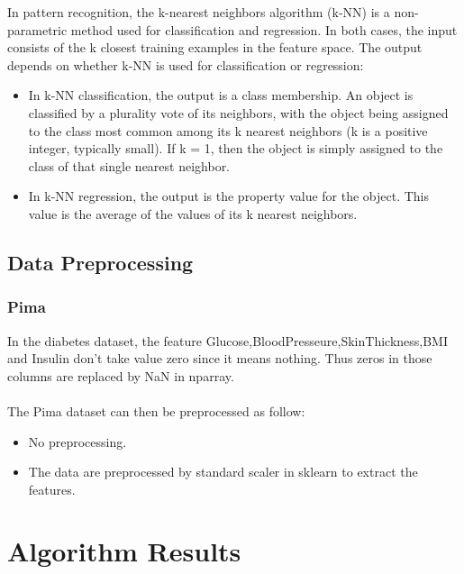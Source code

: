 \documentclass{article}
\begin{document}
In pattern recognition, the k-nearest neighbors algorithm (k-NN) is a non-parametric method used for classification and regression. In both cases, the input consists of the k closest training examples in the feature space. The output depends on whether k-NN is used for classification or regression:\\

\begin{itemize}
\item In k-NN classification, the output is a class membership. An object is classified by a plurality vote of its neighbors, with the object being assigned to the class most common among its k nearest neighbors (k is a positive integer, typically small). If k = 1, then the object is simply assigned to the class of that single nearest neighbor.\\
\item In k-NN regression, the output is the property value for the object. This value is the average of the values of its k nearest neighbors.\\
\end{itemize}

\subsection{Data Preprocessing}
\subsubsection{Pima}
In the diabetes dataset, the feature Glucose,BloodPresseure,SkinThickness,BMI and Insulin don't take value zero since it means nothing. Thus zeros in those columns are replaced by NaN in nparray. \\
\\
The Pima dataset can then be preprocessed as follow:
\begin{itemize} 
\item No preprocessing.
\item The data are preprocessed by standard scaler in sklearn to extract the features.
\end{itemize}






\section{Algorithm Results}
\end{document}
